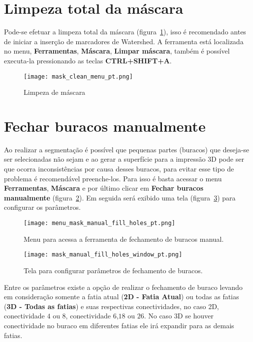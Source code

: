 \section{Limpeza total da máscara}
\label{cap:limpeza_mascara}

Pode-se efetuar a limpeza total da máscara (figura~\ref{fig:limpeza_mascara}), isso é recomendado antes de iniciar a inserção de marcadores de Watershed. A ferramenta está localizada no menu, \textbf{Ferramentas}, \textbf{Máscara}, \textbf{Limpar máscara}, também é possível executa-la pressionando as teclas \textbf{CTRL+SHIFT+A}.

\begin{figure}[!htb]
\centering
\texttt{[image: mask\_clean\_menu\_pt.png]}
\caption{Limpeza de máscara}
\label{fig:limpeza_mascara}
\end{figure}

\section{Fechar buracos manualmente}

Ao realizar a segmentação é possível que pequenas partes (buracos) que deseja-se ser selecionadas não sejam e ao gerar a superfície para a impressão 3D pode ser que ocorra inconsistências por causa desses buracos, para evitar esse tipo de problema é recomendável preenche-los. Para isso é basta acessar o menu \textbf{Ferramentas}, \textbf{Máscara} e por último clicar em \textbf{Fechar buracos manualmente} (figura~\ref{fig:menu_mask_manual_fill_holes}). Em seguida será exibido uma tela (figura~\ref{fig:mask_manual_fill_holes_window}) para configurar os parâmetros.

\begin{figure}[!htb]
\centering
\texttt{[image: menu\_mask\_manual\_fill\_holes\_pt.png]}
\caption{Menu para acessa a ferramenta de fechamento de buracos manual.}
\label{fig:menu_mask_manual_fill_holes}
\end{figure}

\begin{figure}[!htb]
\centering
\texttt{[image: mask\_manual\_fill\_holes\_window\_pt.png]}
\caption{Tela para configurar parâmetros de fechamento de buracos.}
\label{fig:mask_manual_fill_holes_window}
\end{figure}

Entre os parâmetros existe a opção de realizar o fechamento de buraco levando em consideração somente a fatia atual (\textbf{2D - Fatia Atual}) ou todas as fatias (\textbf{3D - Todas as fatias}) e suas respectivas conectividades, no caso 2D, conectividade $4$ ou $8$, conectividade $6$,$18$ ou $26$. No caso 3D se houver conectividade no buraco em diferentes fatias ele irá expandir para as demais fatias.

